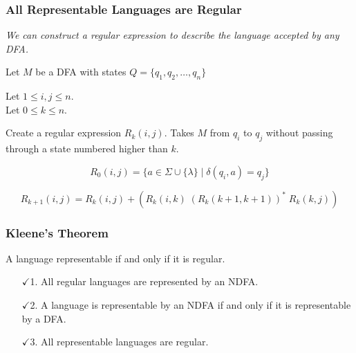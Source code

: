 \documentclass[11 pt]{beamer}
\begin{document}
\begin{frame}
	\frametitle{All Representable Languages are Regular}

	\textit{We can construct a regular expression to describe the language accepted by any DFA.}\\[1 em]
	\pause

	Let $M$ be a DFA with states $Q = \{ q_1, q_2, \dots, q_n \}$
	\pause

	Let $1 \leq i, j \leq n$.\\
	Let $0 \leq k \leq n$.\\

	\pause



	Create a regular expression $R_k(i, j)$. 
	Takes $M$ from $q_i$ to $q_j$ without passing through a state numbered higher than $k$.

	\[
		R_0(i, j) = \{ a \in \Sigma \cup \{ \lambda \} \mid \delta(q_i, a) = q_j \}
	\]


	\[
		R_{k+1}(i, j) = R_k(i, j) + (R_k(i, k) \; (R_k(k+1, k+1))^* \; R_k(k, j))
	\]


\end{frame}

\begin{frame}
	\frametitle{Kleene's Theorem}
	A language representable if and only if it is regular.

	\begin{enumerate}
		\item[$\checkmark $1.] All regular languages are represented by an NDFA.
		\item[$\checkmark $2.] A language is representable by an NDFA if and only if it is representable by a DFA.
		\item[$\checkmark $3.] All representable languages are regular.
	\end{enumerate}
\end{frame}
\end{document}
